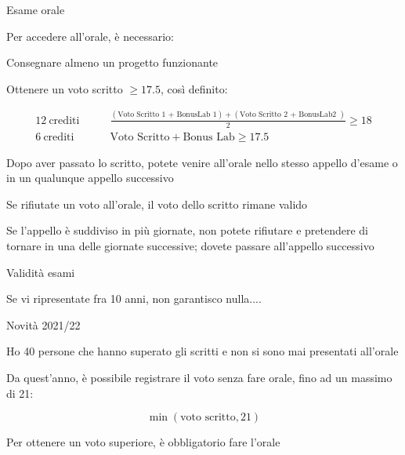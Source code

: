 \begin{frame}{Esame orale}

Per accedere all'orale, è necessario:
\BIL
\item Consegnare almeno un progetto funzionante 
\item Ottenere un voto scritto ${} \geq 17.5$, così definito:

\begingroup
\tiny
\begin{align*}
  \mathrm{12\ crediti} & \qquad \frac{(\textrm{Voto Scritto 1 + BonusLab 1}) + (\textrm{Voto Scritto 2 + BonusLab2 })}{2} \geq 18 \\
  \mathrm{6\ crediti} & \qquad \textrm{Voto Scritto} + \textrm{Bonus Lab} \geq 17.5 
\end{align*}
\endgroup

\item Dopo aver passato lo scritto, potete venire all'orale nello stesso appello d'esame o in un qualunque appello successivo
\item Se rifiutate un voto all’orale, il voto dello scritto rimane valido
\item Se l'appello è suddiviso in più giornate, non potete rifiutare e pretendere di tornare in una delle giornate successive; dovete passare all'appello successivo
\EIL
\end{frame}

\begin{frame}{Validità esami}

\vspace{-9pt}

\medskip
{}

\medskip
{}
\BI
\item Se vi ripresentate fra 10 anni, non garantisco nulla....
\EI

\end{frame}

\begin{frame}{Novità 2021/22}

\BIL
\item Ho 40 persone che hanno superato gli scritti e non si sono mai presentati all'orale
\item Da quest'anno, è possibile registrare il voto senza fare orale, fino ad un massimo di 21:

\[
  \min(\textrm{voto scritto}, 21)
\]

\item Per ottenere un voto superiore, è obbligatorio fare l'orale
\EIL
\end{frame}

